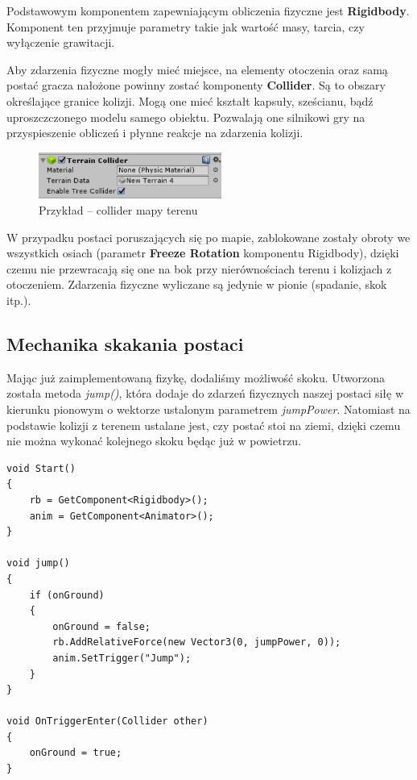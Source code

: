 \documentclass[openright]{xmgr}
\newcommand{\name}[1]{\textbf{\textcolor{NavyBlue}{#1}}}
\begin{document}
      Podstawowym komponentem zapewniającym obliczenia fizyczne jest \name{Rigidbody}. Komponent ten przyjmuje parametry takie jak wartość masy, tarcia, czy wyłączenie grawitacji.

      Aby zdarzenia fizyczne mogły mieć miejsce, na elementy otoczenia oraz samą postać gracza nałożone powinny zostać komponenty \name{Collider}. Są to obszary określające granice kolizji. Mogą one mieć kształt kapsuły, sześcianu, bądź uproszczczonego modelu samego obiektu. Pozwalają one silnikowi gry na przyspieszenie obliczeń i płynne reakcje na zdarzenia kolizji.

      \begin{figure}[H]
      \center
      \includegraphics[width=6cm]{fizyka_1.png}
      \caption{Przykład -- collider mapy terenu}
      \end{figure}

      W przypadku postaci poruszających się po mapie, zablokowane zostały obroty we wszystkich osiach (parametr \name{Freeze Rotation} komponentu Rigidbody), dzięki czemu nie przewracają się one na bok przy nierównościach terenu i kolizjach z otoczeniem. Zdarzenia fizyczne wyliczane są jedynie w pionie (spadanie, skok itp.).

      \subsection{Mechanika skakania postaci}

          Mając już zaimplementowaną fizykę, dodaliśmy możliwość skoku. Utworzona została metoda \textit{jump()}, która dodaje do zdarzeń fizycznych naszej postaci siłę w kierunku pionowym o wektorze ustalonym parametrem \textit{jumpPower}. Natomiast na podstawie kolizji z terenem ustalane jest, czy postać stoi na ziemi, dzięki czemu nie można wykonać kolejnego skoku będąc już w powietrzu.

\begin{minipage}{\textwidth}
\begin{lstlisting}[caption={Fragment algorytmu skoku postaci}]
void Start()
{
    rb = GetComponent<Rigidbody>();
    anim = GetComponent<Animator>();
}

void jump()
{
    if (onGround)
    {
        onGround = false;
        rb.AddRelativeForce(new Vector3(0, jumpPower, 0));
        anim.SetTrigger("Jump");
    }
}

void OnTriggerEnter(Collider other)
{
    onGround = true;
}
\end{lstlisting}
\end{minipage}
\end{document}
